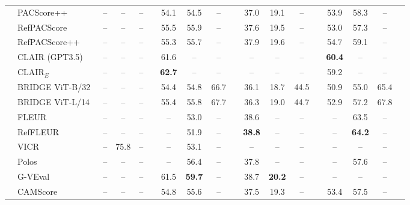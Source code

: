 \begin{table*}[t!]
{\begin{tabular}{c l c c c c c c c c c c c c c c c c}
& PACScore++~\cite{sarto2024positive}      & --   & --   & --   & & 54.1 & 54.5 & -- & & 37.0 & 19.1 & -- & & 53.9 & 58.3 & -- & \\
& RefPACScore~\cite{sarto2023positive}     & --   & --   & --   & & 55.5 & 55.9 & -- & & 37.6 & 19.5 & -- & & 53.0 & 57.3 & -- & \\ 
& RefPACScore++~\cite{sarto2024positive}   & --   & --   & --   & & 55.3 & 55.7 & -- & & 37.9 & 19.6 & -- & & 54.7 & 59.1 & -- & \\ \cmidrule{2-17}
& CLAIR (GPT3.5)~\cite{chan2023clair}      & --   & --   & --   & & 61.6 & -- & -- & & -- & -- & -- & & \textbf{60.4} & -- & -- & \\
& CLAIR$_{E}$~\cite{chan2023clair}         & --   & --   & --   & & \textbf{62.7} & -- & -- & & -- & -- & -- & & 59.2 & -- & -- & \\\cmidrule{2-17}
& BRIDGE ViT-B/32~\cite{sarto2024bridge}   & --   & --   & --   & & 54.4 & 54.8 & 66.7 & & 36.1 & 18.7 & 44.5 & & 50.9 & 55.0 & 65.4 & \\
& BRIDGE ViT-L/14~\cite{sarto2024bridge}   & --   & --   & --   & & 55.4 & 55.8 & 67.7 & & 36.3 & 19.0 & 44.7 & & 52.9 & 57.2 & 67.8 & \\\cmidrule{2-17}
& FLEUR~\cite{lee2024fleur}                           & --   & --   & --   & & --   & 53.0 & --   & & 38.6 & --   & -- & & -- & 63.5 & -- & \\
& RefFLEUR~\cite{lee2024fleur}                        & --   & --   & --   & & --   & 51.9 & --   & & \textbf{38.8} & --   & -- & & -- & \textbf{64.2} & -- & \\\cmidrule{2-17}
& VICR~\cite{narins2024validated}          & --   & 75.8 & --   & & -- & 53.1 & --   & & --    & --   & --   & & --   & --  & --   & \\ \cmidrule{2-17}
& Polos~\cite{wada2024polos}               & --   & --   & --   & & --   & 56.4 & -- & & 37.8 & -- & -- & & -- & 57.6 & -- & \\\cmidrule{2-17}
& G-VEval~\cite{tong2024g}                 & --   & --   & --   & & 61.5 & \textbf{59.7} & -- & & 38.7 & \textbf{20.2} & -- & & -- & -- & -- & \\
\cmidrule{2-17}
& CAMScore~\cite{cui2025evaluating}                        & --   & --   & --   & & 54.8 & 55.6 & -- & & 37.5 & 19.3 & -- & & 53.4 & 57.5 & -- & \\


\end{tabular}}
\end{table*}
